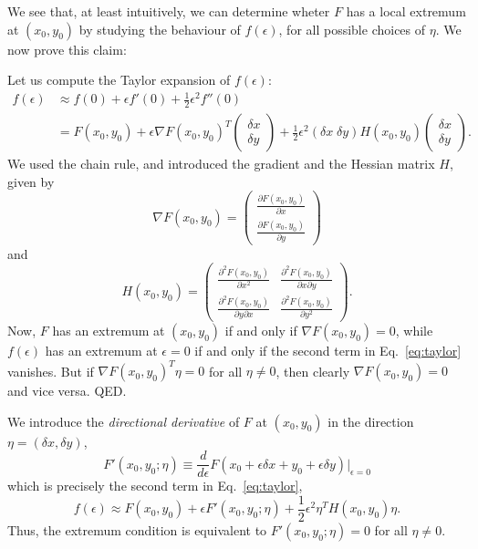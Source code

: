 We see that, at least intuitively, we can determine wheter $F$ has a local
extremum at $(x_0,y_0)$ by studying the behaviour of $f(\epsilon)$, for all
possible choices of $\eta$. We now prove this claim:

Let us compute the Taylor expansion of $f(\epsilon)$:
\begin{equation}
  \begin{split}
    f(\epsilon) &\approx f(0) + \epsilon f'(0) + \tfrac{1}{2}\epsilon^2
    f''(0) \\
    & = F(x_0,y_0) + \epsilon \nabla F(x_0,y_0)^T \begin{pmatrix}
      \delta x\\\delta y\end{pmatrix} + \frac{1}{2} \epsilon^2 (\delta
    x \; \delta y) H(x_0, y_0) \begin{pmatrix} \delta x\\\delta y\end{pmatrix}.
  \end{split} \label{eq:taylor}
\end{equation}
We used the chain rule, and introduced the gradient and the Hessian
matrix $H$, given by
\begin{equation}
  \nabla F(x_0,y_0) = \begin{pmatrix} \frac{\partial
      F(x_0,y_0)}{\partial x} \\ \frac{\partial F(x_0,y_0)}{\partial
      y} \end{pmatrix}
\end{equation}
and
\begin{equation}
  H(x_0,y_0) = \begin{pmatrix} \frac{\partial^2 F(x_0,y_0)}{\partial
      x^2} & \frac{\partial^2 F(x_0,y_0)}{\partial
      x\partial y} \\ \frac{\partial^2 F(x_0,y_0)}{\partial
      y \partial x} & \frac{\partial^2 F(x_0,y_0)}{\partial
      y^2} \end{pmatrix}.
\end{equation}
Now, $F$ has an extremum at $(x_0,y_0)$ if and only if $\nabla
F(x_0,y_0)=0$, while $f(\epsilon)$ has an extremum at $\epsilon=0$ if
and only if the second term in Eq.~\eqref{eq:taylor}
vanishes. But if $\nabla F(x_0,y_0)^T\eta=0$ for all $\eta\neq 0$,
then clearly $\nabla F(x_0,y_0)=0$ and vice versa. QED.

We introduce the \emph{directional derivative} of $F$ at $(x_0,y_0)$
in the direction $\eta = (\delta x, \delta y)$,
\begin{equation}
  F'(x_0,y_0;\eta) \equiv \frac{d}{d\epsilon} F(x_0+\epsilon\delta x +
  y_0 + \epsilon\delta y)\Big|_{\epsilon=0}  \label{eq:2d-directional}
\end{equation}
which is precisely the second term in Eq.~\eqref{eq:taylor},
\begin{equation}
  f(\epsilon) \approx F(x_0,y_0) + \epsilon F'(x_0,y_0; \eta) +
  \frac{1}{2}\epsilon^2 \eta^T H(x_0, y_0) \eta.
\end{equation}
Thus, the extremum condition is equivalent to $F'(x_0,y_0;\eta)=0$ for
all $\eta\neq 0$. 


